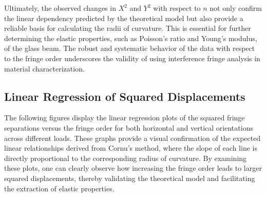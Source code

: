 \documentclass[a4paper,11pt]{article}
\begin{document}
Ultimately, the observed changes in \(X^2\) and \(Y^2\) with respect to \(n\) not only confirm the linear dependency predicted by the theoretical model but also provide a reliable basis for calculating the radii of curvature. This is essential for further determining the elastic properties, such as Poisson's ratio and Young's modulus, of the glass beam. The robust and systematic behavior of the data with respect to the fringe order underscores the validity of using interference fringe analysis in material characterization.\\

\subsection{Linear Regression of Squared Displacements}
\label{subsec:LINEAR REGRESSION}
\indent 

The following figures display the linear regression plots of the squared fringe separations versus the fringe order for both horizontal and vertical orientations across different loads. These graphs provide a visual confirmation of the expected linear relationships derived from Cornu's method, where the slope of each line is directly proportional to the corresponding radius of curvature. By examining these plots, one can clearly observe how increasing the fringe order leads to larger squared displacements, thereby validating the theoretical model and facilitating the extraction of elastic properties.\\
\end{document}
